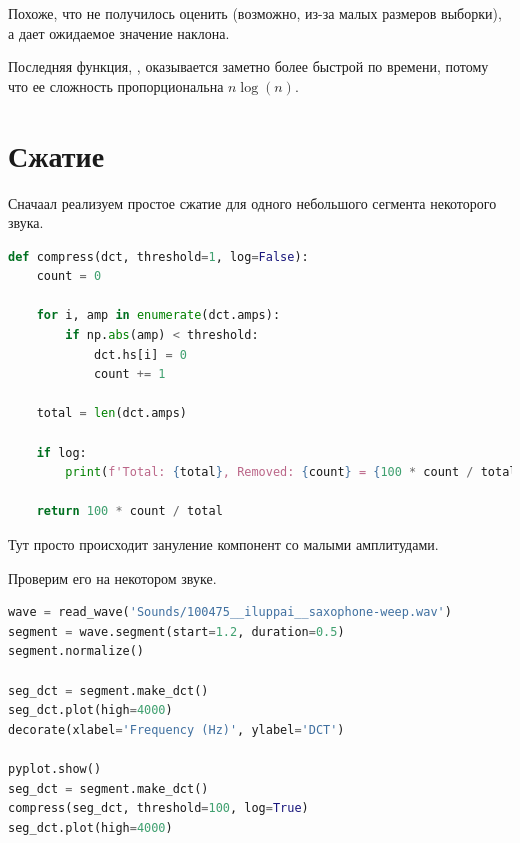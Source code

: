 \documentclass[a4paper,12pt]{report}
\begin{document}
    Похоже, что  не получилось оценить (возможно, из-за малых размеров выборки), а  дает ожидаемое значение наклона. 
    
    Последняя функция, , оказывается заметно более быстрой по времени, потому что ее сложность пропорциональна $n\log(n)$. 
    
    \chapter{Сжатие}
    
    Сначаал реализуем простое сжатие для одного небольшого сегмента некоторого звука.
    
\begin{lstlisting}[language=Python,caption=Сжатие сегмента]
def compress(dct, threshold=1, log=False):
    count = 0
    
    for i, amp in enumerate(dct.amps):
        if np.abs(amp) < threshold:
            dct.hs[i] = 0
            count += 1
            
    total = len(dct.amps)
    
    if log:
        print(f'Total: {total}, Removed: {count} = {100 * count / total:.1f}%', sep='\t')
    
    return 100 * count / total
\end{lstlisting}

    Тут просто происходит зануление компонент со  малыми амплитудами.
    
    Проверим его на некотором звуке.

\begin{lstlisting}[language=Python,caption=Сжатие сегмента]
wave = read_wave('Sounds/100475__iluppai__saxophone-weep.wav')
segment = wave.segment(start=1.2, duration=0.5)
segment.normalize()

seg_dct = segment.make_dct()
seg_dct.plot(high=4000)
decorate(xlabel='Frequency (Hz)', ylabel='DCT')

pyplot.show()
seg_dct = segment.make_dct()
compress(seg_dct, threshold=100, log=True)
seg_dct.plot(high=4000)
\end{lstlisting}
\end{document}

